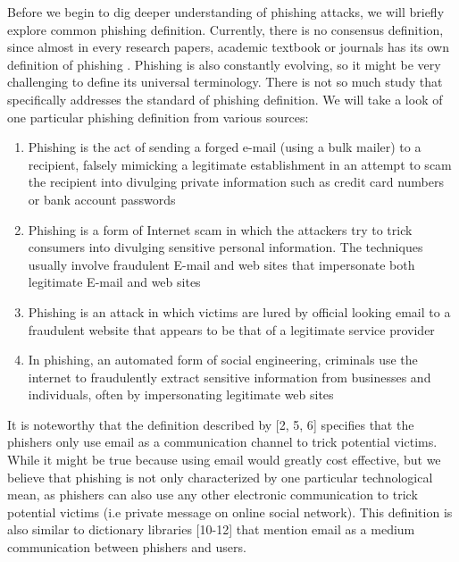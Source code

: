 Before we begin to dig deeper understanding of phishing attacks, we
will briefly explore common phishing definition. Currently, there
is no consensus definition, since almost in every research papers,
academic textbook or journals has its own definition of phishing \citep{jakobsson:2006,james:2005,tally:2004,clayton:2005,parno:2006,jakobsson:2005,dhamija:2006}.
Phishing is also constantly evolving, so it might be very challenging
to define its universal terminology. There is not so much study that
specifically addresses the standard of phishing definition. We will
take a look of one particular phishing definition from various sources:
\begin{enumerate}
\item Phishing is the act of sending a forged e-mail (using a bulk mailer)
to a recipient, falsely mimicking a legitimate establishment in an
attempt to scam the recipient into divulging private information such
as credit card numbers or bank account passwords \citep{james:2005}
\item Phishing is a form of Internet scam in which the attackers try to
trick consumers into divulging sensitive personal information. The
techniques usually involve fraudulent E-mail and web sites that impersonate
both legitimate E-mail and web sites \citep{tally:2004}
\item Phishing is an attack in which victims are lured by official looking
email to a fraudulent website that appears to be that of a legitimate
service provider \citep{clayton:2005}
\item In phishing, an automated form of social engineering, criminals use
the internet to fraudulently extract sensitive information from businesses
and individuals, often by impersonating legitimate web sites \citep{parno:2006}
\end{enumerate}
It is noteworthy that the definition described by {[}2, 5, 6{]} specifies
that the phishers only use email as a communication channel to trick
potential victims. While it might be true because using email would
greatly cost effective, but we believe that phishing is not only characterized
by one particular technological mean, as phishers can also use any
other electronic communication to trick potential victims (i.e private
message on online social network). This definition is also similar
to dictionary libraries {[}10-12{]} that mention email as a medium
communication between phishers and users.

